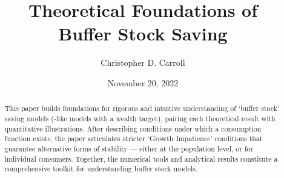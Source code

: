 \documentclass[BufferStockTheory]{subfiles}
\begin{document}



\title{Theoretical Foundations of \\ Buffer Stock Saving}

\author{Christopher D. Carroll\authNum}



\renewcommand{\forcedate}{November 20, 2022}\date{\forcedate}

\maketitle
\hypertarget{abstract}{}
\begin{abstract}
  This paper builds foundations for rigorous and intuitive understanding of `buffer stock' saving models (\cite{bewleyPIH}-like models with a wealth target), pairing each theoretical result with quantitative illustrations.  After describing conditions under which a consumption function exists, the paper articulates stricter `Growth Impatience' conditions that guarantee alternative forms of stability --- either at the population level, or for individual consumers.  Together, the numerical tools and analytical results constitute a comprehensive toolkit for understanding buffer stock models.
\end{abstract}

\hypertarget{links}{}
\end{document}
